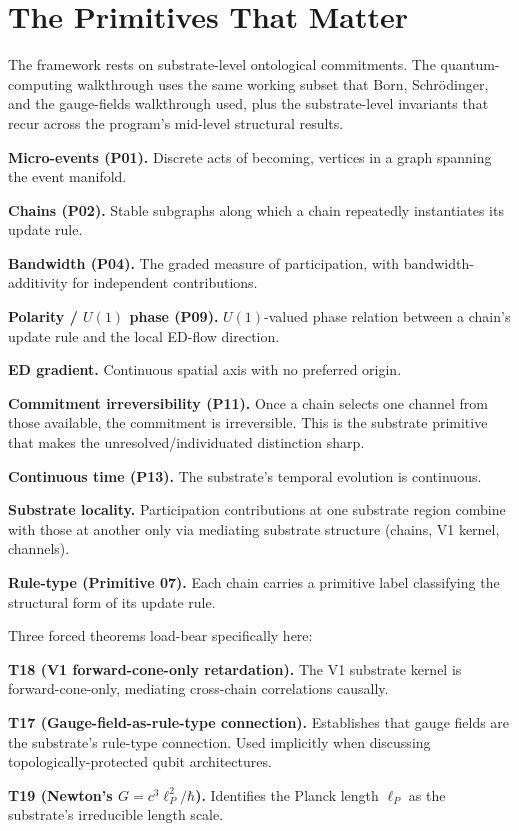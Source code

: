 \documentclass[11pt,a4paper]{article}
\begin{document}
\section{The Primitives That Matter}

The framework rests on substrate-level ontological commitments. The quantum-computing walkthrough uses the same working subset that Born, Schr\"odinger, and the gauge-fields walkthrough used, plus the substrate-level invariants that recur across the program's mid-level structural results.

\textbf{Micro-events (P01).} Discrete acts of becoming, vertices in a graph spanning the event manifold.

\textbf{Chains (P02).} Stable subgraphs along which a chain repeatedly instantiates its update rule.

\textbf{Bandwidth (P04).} The graded measure of participation, with bandwidth-additivity for independent contributions.

\textbf{Polarity / $U(1)$ phase (P09).} $U(1)$-valued phase relation between a chain's update rule and the local ED-flow direction.

\textbf{ED gradient.} Continuous spatial axis with no preferred origin.

\textbf{Commitment irreversibility (P11).} Once a chain selects one channel from those available, the commitment is irreversible. This is the substrate primitive that makes the unresolved/individuated distinction sharp.

\textbf{Continuous time (P13).} The substrate's temporal evolution is continuous.

\textbf{Substrate locality.} Participation contributions at one substrate region combine with those at another only via mediating substrate structure (chains, V1 kernel, channels).

\textbf{Rule-type (Primitive 07).} Each chain carries a primitive label classifying the structural form of its update rule.

Three forced theorems load-bear specifically here:

\textbf{T18 (V1 forward-cone-only retardation).} The V1 substrate kernel is forward-cone-only, mediating cross-chain correlations causally.

\textbf{T17 (Gauge-field-as-rule-type connection).} Establishes that gauge fields are the substrate's rule-type connection. Used implicitly when discussing topologically-protected qubit architectures.

\textbf{T19 (Newton's $G = c^3 \ell_P^2/\hbar$).} Identifies the Planck length $\ell_P$ as the substrate's irreducible length scale.
\end{document}

